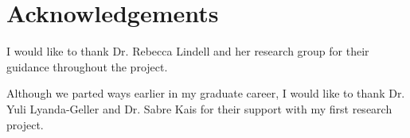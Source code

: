 \chapter[Acknowledgements]{Acknowledgements}

I would like to thank Dr. Rebecca Lindell and her research group for their guidance throughout the project.

Although we parted ways earlier in my graduate career, I would like to thank Dr. Yuli Lyanda-Geller and Dr. Sabre Kais for their support with my first research project.